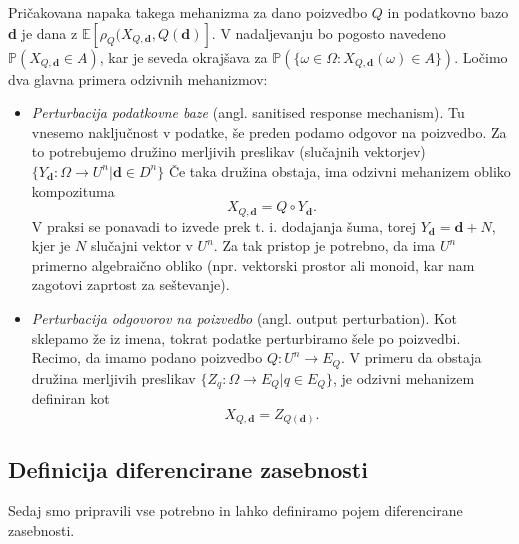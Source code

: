 \documentclass[12pt,a4paper]{amsart}
\theoremstyle{definition} %
\theoremstyle{plain} %
\begin{document}
Pričakovana napaka takega mehanizma za dano poizvedbo $Q$ in podatkovno bazo \textbf{d} je dana z $\mathbb{E}[\rho_{Q}(X_{Q,\textbf{d}},Q(\textbf{d})]$. 
V nadaljevanju bo pogosto navedeno $\mathbb{P}(X_{Q,\textbf{d}} \in A)$, kar je seveda okrajšava za $\mathbb{P}(\{\omega \in \Omega : X_{Q,\textbf{d}}(\omega) \in A \})$.
\newline
\newline
Ločimo dva glavna primera odzivnih mehanizmov:
\begin{itemize}
\item \textit{Perturbacija podatkovne baze} (angl. sanitised response mechanism). Tu vnesemo naključnost v podatke, še preden podamo odgovor na poizvedbo. Za to potrebujemo družino merljivih preslikav (slučajnih vektorjev) $\{ Y_{\textbf{d}}: \Omega \rightarrow U^n | \textbf{d} \in D^n\}$ Če taka družina obstaja, ima odzivni mehanizem obliko kompozituma
\begin{equation}\label{odzivni2}
 X_{Q,\textbf{d}} = Q \circ Y_{\textbf{d}}. \tag{2}
\end{equation} 
V praksi se ponavadi to izvede prek t. i. dodajanja šuma, torej $Y_{\textbf{d}} = \textbf{d}+N$, kjer je $N$ slučajni vektor v $U^n$. Za tak pristop je potrebno, da ima $U^n$ primerno algebraično obliko (npr. vektorski prostor ali monoid, kar nam zagotovi zaprtost za seštevanje).
\item \textit{Perturbacija odgovorov na poizvedbo} (angl. output perturbation). Kot sklepamo že iz imena, tokrat podatke perturbiramo šele po poizvedbi. Recimo, da imamo podano poizvedbo $Q: U^n \rightarrow E_{Q}$. V primeru da obstaja družina merljivih preslikav $ \{Z_{q}:\Omega \rightarrow E_{Q} | q  \in E_{Q} \}$, je odzivni mehanizem definiran kot
\begin{equation}\label{odzivni3}
X_{Q,\textbf{d}}=Z_{Q(\textbf{d})}.\tag{3}
\end{equation} 
\end{itemize}

\subsection{Definicija diferencirane zasebnosti}
Sedaj smo pripravili vse potrebno in lahko definiramo pojem diferencirane zasebnosti.
\end{document}
